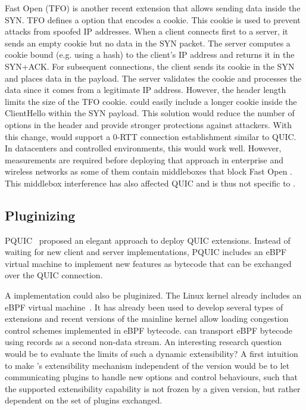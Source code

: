 \tcp Fast Open (TFO) \cite{rfc7413,radhakrishnan2011tcp} is another recent
\tcp extension that allows sending data inside the SYN. TFO defines a
\tcp option that encodes a cookie. This cookie is used to prevent attacks
from spoofed IP addresses. When a client connects first to a server, it sends
an empty cookie but no data in the SYN packet. The server computes a cookie
bound (e.g. using a hash) to the client's IP address and returns it
in the SYN+ACK. For subsequent connections, the client sends its cookie in the SYN
and places data in the payload. The server validates the cookie and processes
the data since it comes from a legitimate IP address. However, the \tcp header
length limits the size of the TFO cookie. \tcpls could easily include
a longer cookie inside the \tls ClientHello within the SYN
payload. This solution would reduce the number of options in the \tcp header
and provide stronger protections against attackers. With this change, \tcpls
would support a 0-RTT connection establishment similar to QUIC. In datacenters and controlled environments, this would work well. However, measurements
are required before deploying that approach in enterprise and
wireless networks as some of them contain middleboxes that block \tcp Fast Open
\cite{paasch2016network}. This middlebox interference has also affected QUIC \cite{langley2017quic} and is thus not specific to \tcp.


\subsection{Pluginizing \tcpls}

PQUIC~\cite{de2019pluginizing} proposed an elegant approach to deploy
QUIC extensions. Instead of waiting for new client and server implementations,
PQUIC includes an eBPF virtual machine to implement new features as bytecode
that can be exchanged over the QUIC connection.

A \tcpls implementation could also be pluginized. The Linux kernel
already includes an eBPF virtual machine~\cite{ebpf:2014}.
It has already been used to develop several types of
\tcp extensions \cite{brakmo2017tcp, tran2019beyond, tran2020beyond}
and recent versions of the mainline kernel allow loading congestion control schemes implemented in eBPF bytecode. \tcpls can transport eBPF bytecode using
\tls records as a second non-data stream.
An interesting research question would be to evaluate the
limits of such a dynamic extensibility? A first intuition to make \tcp's
extensibility mechanism independent of the \tcpls version would be to let \tcpls
communicating plugins to handle new \tcp options and control behaviours, such that the
supported \tcp extensibility capability is not frozen by a given \tcpls
version, but rather dependent on the set of plugins exchanged.


